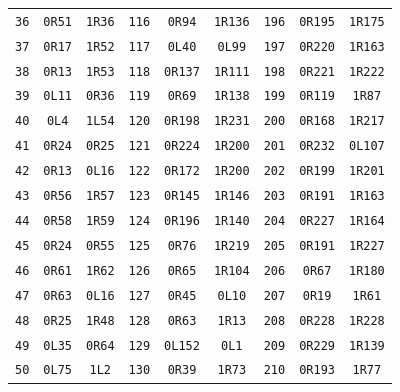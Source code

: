 \begin{longtable}{@{}rcc@{\hspace{1.6em}}rcc@{\hspace{1.6em}}rcc@{}}
\texttt{36} & \texttt{0R51} & \texttt{1R36} & \texttt{116} & \texttt{0R94} & \texttt{1R136} & \texttt{196} & \texttt{0R195} & \texttt{1R175}\\
\texttt{37} & \texttt{0R17} & \texttt{1R52} & \texttt{117} & \texttt{0L40} & \texttt{0L99} & \texttt{197} & \texttt{0R220} & \texttt{1R163}\\
\texttt{38} & \texttt{0R13} & \texttt{1R53} & \texttt{118} & \texttt{0R137} & \texttt{1R111} & \texttt{198} & \texttt{0R221} & \texttt{1R222}\\
\texttt{39} & \texttt{0L11} & \texttt{0R36} & \texttt{119} & \texttt{0R69} & \texttt{1R138} & \texttt{199} & \texttt{0R119} & \texttt{1R87}\\
\texttt{40} & \texttt{0L4} & \texttt{1L54} & \texttt{120} & \texttt{0R198} & \texttt{1R231} & \texttt{200} & \texttt{0R168} & \texttt{1R217}\\
\texttt{41} & \texttt{0R24} & \texttt{0R25} & \texttt{121} & \texttt{0R224} & \texttt{1R200} & \texttt{201} & \texttt{0R232} & \texttt{0L107}\\
\texttt{42} & \texttt{0R13} & \texttt{0L16} & \texttt{122} & \texttt{0R172} & \texttt{1R200} & \texttt{202} & \texttt{0R199} & \texttt{1R201}\\
\texttt{43} & \texttt{0R56} & \texttt{1R57} & \texttt{123} & \texttt{0R145} & \texttt{1R146} & \texttt{203} & \texttt{0R191} & \texttt{1R163}\\
\texttt{44} & \texttt{0R58} & \texttt{1R59} & \texttt{124} & \texttt{0R196} & \texttt{1R140} & \texttt{204} & \texttt{0R227} & \texttt{1R164}\\
\texttt{45} & \texttt{0R24} & \texttt{0R55} & \texttt{125} & \texttt{0R76} & \texttt{1R219} & \texttt{205} & \texttt{0R191} & \texttt{1R227}\\
\texttt{46} & \texttt{0R61} & \texttt{1R62} & \texttt{126} & \texttt{0R65} & \texttt{1R104} & \texttt{206} & \texttt{0R67} & \texttt{1R180}\\
\texttt{47} & \texttt{0R63} & \texttt{0L16} & \texttt{127} & \texttt{0R45} & \texttt{0L10} & \texttt{207} & \texttt{0R19} & \texttt{1R61}\\
\texttt{48} & \texttt{0R25} & \texttt{1R48} & \texttt{128} & \texttt{0R63} & \texttt{1R13} & \texttt{208} & \texttt{0R228} & \texttt{1R228}\\
\texttt{49} & \texttt{0L35} & \texttt{0R64} & \texttt{129} & \texttt{0L152} & \texttt{0L1} & \texttt{209} & \texttt{0R229} & \texttt{1R139}\\
\texttt{50} & \texttt{0L75} & \texttt{1L2} & \texttt{130} & \texttt{0R39} & \texttt{1R73} & \texttt{210} & \texttt{0R193} & \texttt{1R77}\\

\end{longtable}
